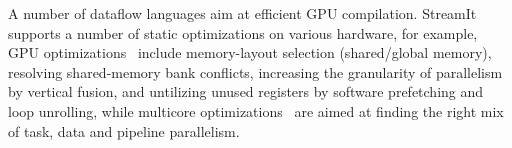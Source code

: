 A number of dataflow languages aim at efficient GPU compilation.
StreamIt supports a number of static optimizations on various
hardware, for example, GPU
optimizations~\cite{Hormati:2011:SPS:1950365.1950409} include
memory-layout selection (shared/global memory), resolving
shared-memory bank conflicts, increasing the granularity of
parallelism by vertical fusion, and untilizing unused registers by
software prefetching and loop unrolling, while multicore
optimizations~\cite{Gordon:2006:ECT:1168857.1168877} are aimed at
finding the right mix of task, data and pipeline parallelism.

